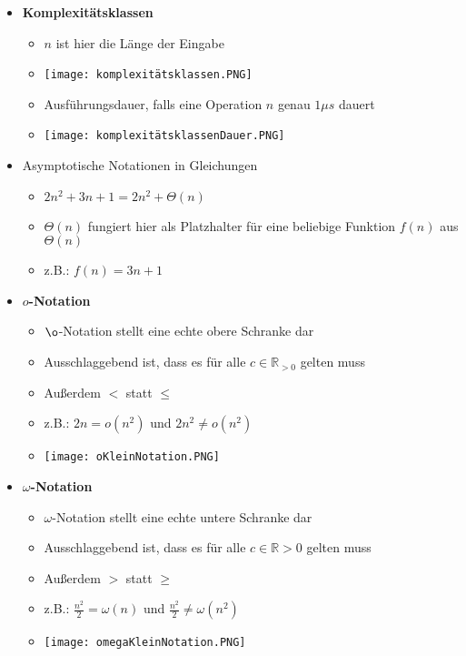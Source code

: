\begin{itemize}
        \item \textbf{Komplexitätsklassen}
            \begin{itemize}
                \item $n$ ist hier die Länge der Eingabe
                \item[] \texttt{[image: komplexitätsklassen.PNG]}
                \item Ausführungsdauer, falls eine Operation $n$ genau $1\mu s$ dauert 
                \item[] \texttt{[image: komplexitätsklassenDauer.PNG]}
            \end{itemize}
        
        \item Asymptotische Notationen in Gleichungen
            \begin{itemize}
                \item $2n^2 + 3n + 1 = 2n^2 + \Theta(n)$
                \item $\Theta(n)$ fungiert hier als Platzhalter für eine beliebige Funktion $f(n)$ aus $\Theta(n)$
                \item z.B.: $f(n) = 3n + 1$
            \end{itemize}
        
        \item \textbf{$o$-Notation}
            \begin{itemize}
                \item $\o$-Notation stellt eine echte obere Schranke dar
                \item Ausschlaggebend ist, dass es für alle $c \in \mathbb{R}_{>0}$ gelten muss
                \item Au\ss erdem $<$ statt $\leq$
                \item z.B.: $2n = o(n^2)$ und $2n^2 \neq o(n^2)$ 
                \item[] \texttt{[image: oKleinNotation.PNG]}
                
            \end{itemize}
        
        \item \textbf{$\omega$-Notation}
            \begin{itemize}
                \item $\omega$-Notation stellt eine echte untere Schranke dar
                \item Ausschlaggebend ist, dass es für alle $c \in \mathbb{R}{>0}$ gelten muss
                \item Au\ss erdem $>$ statt $\geq$
                \item z.B.: $\frac{n^2}{2} = \omega(n)$ und $\frac{n^2}{2} \neq \omega(n^2)$
                \item[] \texttt{[image: omegaKleinNotation.PNG]}
            \end{itemize}
    \end{itemize}


